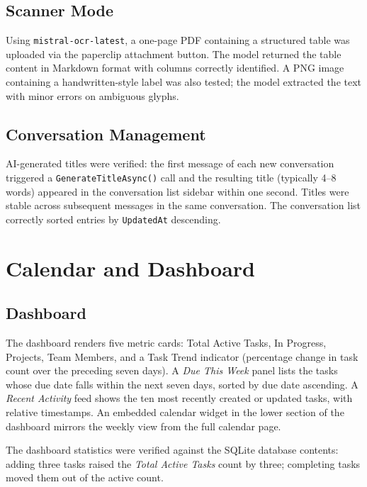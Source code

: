 \subsection*{Scanner Mode}

Using \texttt{mistral-ocr-latest}, a one-page PDF containing a structured table was
uploaded via the paperclip attachment button.
The model returned the table content in Markdown format with columns correctly
identified.
A PNG image containing a handwritten-style label was also tested; the model extracted
the text with minor errors on ambiguous glyphs.

\subsection*{Conversation Management}

AI-generated titles were verified: the first message of each new conversation triggered
a \texttt{Generate\-Title\-Async()} call and the resulting title (typically 4--8 words)
appeared in the conversation list sidebar within one second.
Titles were stable across subsequent messages in the same conversation.
The conversation list correctly sorted entries by \texttt{UpdatedAt} descending.

\section{Calendar and Dashboard}\label{sec:res_calendar}

\subsection*{Dashboard}

The dashboard renders five metric cards: Total Active Tasks, In Progress, Projects,
Team Members, and a Task Trend indicator (percentage change in task count over the
preceding seven days).
A \emph{Due This Week} panel lists the tasks whose due date falls within the next seven
days, sorted by due date ascending.
A \emph{Recent Activity} feed shows the ten most recently created or updated tasks,
with relative timestamps.
An embedded calendar widget in the lower section of the dashboard mirrors the weekly
view from the full calendar page.

The dashboard statistics were verified against the SQLite database contents:
adding three tasks raised the \emph{Total Active Tasks} count by three; completing
tasks moved them out of the active count.

